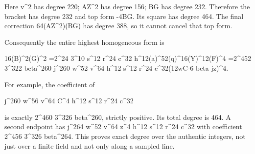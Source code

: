 Here v\textasciicircum{}\allowbreak{}2 has degree 220; AZ\textasciicircum{}\allowbreak{}2 has degree 156; BG has degree 232. Therefore the bracket has degree 232 and top form -4B\textasteriskcentered{}\allowbreak{}G\textasteriskcentered{}\allowbreak{}. Its square has degree 464. The final correction 64(AZ\textasciicircum{}\allowbreak{}2)(BG) has degree 388, so it cannot cancel that top form.



Consequently the entire highest homogeneous form is



16(B\textasteriskcentered{}\allowbreak{})\textasciicircum{}\allowbreak{}2(G\textasteriskcentered{}\allowbreak{})\textasciicircum{}\allowbreak{}2 =\allowbreak{}2\textasciicircum{}\allowbreak{}24 3\textasciicircum{}\allowbreak{}10 s\textasciicircum{}\allowbreak{}12 r\textasciicircum{}\allowbreak{}24 c\textasciicircum{}\allowbreak{}32 h\textasciicircum{}\allowbreak{}12(a\textasteriskcentered{}\allowbreak{})\textasciicircum{}\allowbreak{}52(q\textasteriskcentered{}\allowbreak{})\textasciicircum{}\allowbreak{}16(Y\textasteriskcentered{}\allowbreak{})\textasciicircum{}\allowbreak{}12(F\textasteriskcentered{}\allowbreak{})\textasciicircum{}\allowbreak{}4 =\allowbreak{}2\textasciicircum{}\allowbreak{}452 3\textasciicircum{}\allowbreak{}322 beta\textasciicircum{}\allowbreak{}260 j\textasciicircum{}\allowbreak{}260 w\textasciicircum{}\allowbreak{}52 v\textasciicircum{}\allowbreak{}64 h\textasciicircum{}\allowbreak{}12 s\textasciicircum{}\allowbreak{}12 r\textasciicircum{}\allowbreak{}24 c\textasciicircum{}\allowbreak{}32(12wC-6 beta jz)\textasciicircum{}\allowbreak{}4.



For example, the coefficient of



j\textasciicircum{}\allowbreak{}260 w\textasciicircum{}\allowbreak{}56 v\textasciicircum{}\allowbreak{}64 C\textasciicircum{}\allowbreak{}4 h\textasciicircum{}\allowbreak{}12 s\textasciicircum{}\allowbreak{}12 r\textasciicircum{}\allowbreak{}24 c\textasciicircum{}\allowbreak{}32



is exactly 2\textasciicircum{}\allowbreak{}460 3\textasciicircum{}\allowbreak{}326 beta\textasciicircum{}\allowbreak{}260, strictly positive. Its total degree is 464. A second endpoint has j\textasciicircum{}\allowbreak{}264 w\textasciicircum{}\allowbreak{}52 v\textasciicircum{}\allowbreak{}64 z\textasciicircum{}\allowbreak{}4 h\textasciicircum{}\allowbreak{}12 s\textasciicircum{}\allowbreak{}12 r\textasciicircum{}\allowbreak{}24 c\textasciicircum{}\allowbreak{}32 with coefficient 2\textasciicircum{}\allowbreak{}456 3\textasciicircum{}\allowbreak{}326 beta\textasciicircum{}\allowbreak{}264. This proves exact degree over the authentic integers, not just over a finite field and not only along a sampled line.



